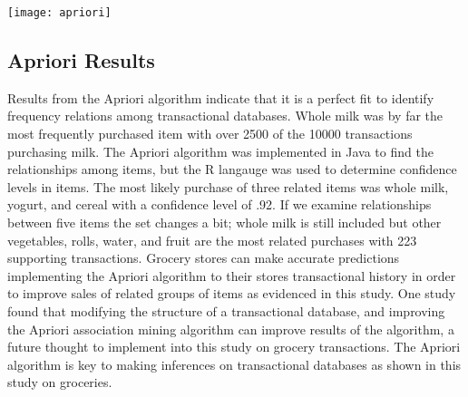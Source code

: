 \documentclass[times, 12pt,twocolumn]{article}
\begin{document}
\texttt{[image: apriori]}

\subsection{Apriori Results}
Results from the Apriori algorithm indicate that it is a perfect fit to identify frequency relations among transactional databases. Whole milk was by far the most frequently purchased item with over 2500 of the 10000 transactions purchasing milk. The Apriori algorithm was implemented in Java to find the relationships among items, but the R langauge was used to determine confidence levels in items. The most likely purchase of three related items was whole milk, yogurt, and cereal with a confidence level of .92. If we examine relationships between five items the set changes a bit; whole milk is still included but other vegetables, rolls, water, and fruit are the most related purchases with 223 supporting transactions.
Grocery stores can make accurate predictions implementing the Apriori algorithm to their stores transactional history in order to improve sales of related groups of items as evidenced in this study. One study found that modifying the structure of a transactional database, and improving the Apriori association mining algorithm can improve results of the algorithm, a future thought to implement into this study on grocery transactions.\cite{Art5} The Apriori algorithm is key to making inferences on transactional databases as shown in this study on groceries.

\begin{figure*}

    \hspace{0in}
\end{figure*}



\end{document}
